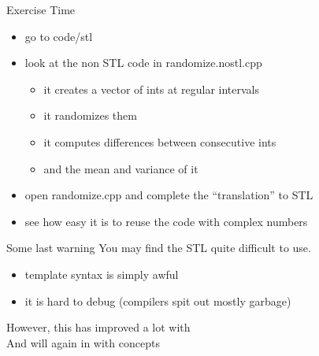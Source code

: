 \begin{frame}[fragile]
  \begin{alertblock}{Exercise Time}
    \begin{itemize}
    \item go to code/stl
    \item look at the non STL code in randomize.nostl.cpp 
      \begin{itemize}
        \item it creates a vector of ints at regular intervals
        \item it randomizes them
        \item it computes differences between consecutive ints
        \item and the mean and variance of it
      \end{itemize}
    \item open randomize.cpp and complete the ``translation'' to STL
    \item see how easy it is to reuse the code with complex numbers
    \end{itemize}
  \end{alertblock}
\end{frame}

\begin{frame}[fragile]
  \begin{alertblock}{Some last warning}
    You may find the STL quite difficult to use.
    \begin{itemize}
    \item template syntax is simply awful
    \item it is hard to debug (compilers spit out mostly garbage)
    \end{itemize}
    However, this has improved a lot with  \\
    And will again in  with concepts
  \end{alertblock}
\end{frame}

